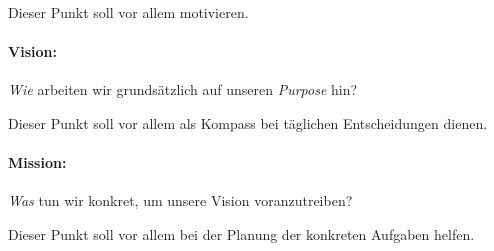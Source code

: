 Dieser Punkt soll vor allem motivieren.

\paragraph{Vision:} \emph{Wie} arbeiten wir grundsätzlich auf unseren \emph{Purpose} hin?

Dieser Punkt soll vor allem als Kompass bei täglichen Entscheidungen dienen.


\paragraph{Mission:} \emph{Was} tun wir konkret, um unsere Vision voranzutreiben?

Dieser Punkt soll vor allem bei der Planung der konkreten Aufgaben helfen.
